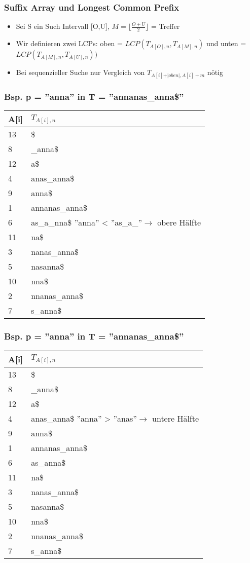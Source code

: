 \documentclass{beamer}
\begin{document}
\begin{frame}
\frametitle{Suffix Array und Longest Common Prefix}
\begin{itemize}
\item Sei S ein Such Intervall [O,U], $M = \lfloor \frac{O+U}{2}\rfloor$ = Treffer
\item Wir definieren zwei LCPs: oben = $LCP(T_{A[O],n},T_{A[M],n})$ und unten = $LCP(T_{A[M],n},T_{A[U],n}))$
\item Bei sequenzieller Suche nur Vergleich von $T_{A[i]+\vert oben\vert, A[i]+m}$ nötig
\end{itemize}
\end{frame}
\begin{frame}
\frametitle{Bsp. p = ''anna'' in T = ''annanas\_anna\$''}
\begin{tabular}{l|l<{\ttfamily}}
\textbf{A[i]} & $T_{A[i],n}$\\\hline
13 & \$\\
8 & \_anna\$\\
12 & a\$\\
4 & anas\_anna\$\\
9 & anna\$\\
1 & annanas\_anna\$\\
6 & \color{red}as\_a\_\color{black}nna\$ ''anna'' < \color{red}''as\_a\_''\color{black}$\rightarrow$ obere Hälfte\\%
11 & na\$\\
3 & nanas\_anna\$\\
5 & nasanna\$\\
10 & nna\$\\
2 & nnanas\_anna\$\\
7 & s\_anna\$\\
\end{tabular}
\end{frame}

\begin{frame}
\frametitle{Bsp. p = ''anna'' in T = ''annanas\_anna\$''}
\begin{tabular}{l|l<{\ttfamily}}
\textbf{A[i]} & $T_{A[i],n}$\\\hline
13 & \$\\
8 & \_anna\$\\
12 & a\$\\
4 & \color{red}anas\color{black}\_anna\$ ''anna'' > \color{red}''anas''\color{black}$\rightarrow$ untere Hälfte\\ %
9 & anna\$\\
1 & annanas\_anna\$\\
6 & as\_anna\$ \\
11 & \color{gray}na\$\\
3 & \color{gray}nanas\_anna\$\\
5 & \color{gray}nasanna\$\\
10 & \color{gray}nna\$\\
2 & \color{gray}nnanas\_anna\$\\
7 & \color{gray}s\_anna\$\\
\end{tabular}
\end{frame}
\end{document}
